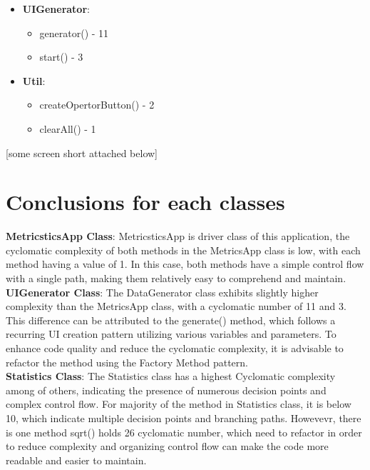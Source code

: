\documentclass[12pt,letterpaper]{report}
\begin{document}
 \begin{itemize}
 \item \textbf{UIGenerator}: 
    \begin{itemize}
        \item generator() - 11
        \item start() - 3
    \end{itemize}
 \end{itemize}

 \begin{itemize}
 \item \textbf{Util}:  
    \begin{itemize}
        \item createOpertorButton() - 2
        \item clearAll() - 1
    \end{itemize}
 \end{itemize}

[some screen short attached below]

\section{Conclusions for each classes}
\textbf{MetricsticsApp Class}: MetricsticsApp is driver class of this application, the cyclomatic complexity of both methods in the MetricsApp class is low, with each method having a value of 1. In this case, both methods have a simple control flow with a single path, making them relatively easy to comprehend and maintain.\\
 
\textbf{UIGenerator Class}: 
The DataGenerator class exhibits slightly higher complexity than the MetricsApp class, with a cyclomatic number of 11 and 3. This difference can be attributed to the generate() method, which follows a recurring UI creation pattern utilizing various variables and parameters. To enhance code quality and reduce the cyclomatic complexity, it is advisable to refactor the method using the Factory Method pattern.\\

\textbf{Statistics Class}: 
The Statistics class has a highest Cyclomatic complexity among of others, indicating the presence of numerous decision points and complex control flow. For majority of the method in Statistics class, it is below 10, which indicate multiple decision points and branching paths. Howevevr, there is one method sqrt() holds 26 cyclomatic number, which need to refactor in order to reduce complexity and organizing control flow can make the code more readable and easier to maintain.\\
\end{document}
